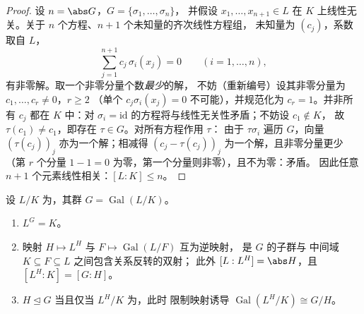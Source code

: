 \begin{proof}
设 $n = \abs G$，$G = \{\sigma_1, \dots, \sigma_n\}$，
并假设 $x_1, \dots, x_{n+1} \in L$ 在
$K$ 上线性无关。关于 $n$ 个方程、$n+1$ 个未知量的齐次线性方程组，
未知量为 $(c_j)$，系数取自 $L$，
\[
\sum_{j=1}^{n+1} c_j\,\sigma_i(x_j) = 0
\qquad (i = 1, \dots, n),
\]
有非零解。取一个非零分量个数\emph{最少}的解，
不妨（重新编号）设其非零分量为 $c_1, \dots, c_r \neq 0$，$r \geq 2$
（单个 $c_j\sigma_i(x_j) = 0$ 不可能），并规范化为
$c_r = 1$。并非所有 $c_j$ 都在 $K$ 中：对 $\sigma_i =
\mathrm{id}$ 的方程将与线性无关性矛盾；不妨设 $c_1 \notin K$，
故 $\tau(c_1) \ne c_1$，即存在 $\tau \in G$。对所有方程作用 $\tau$：
由于 $\tau\sigma_i$ 遍历 $G$，向量
$(\tau(c_j))_j$ 亦为一个解；相减得 $(c_j -
\tau(c_j))_j$ 为一个解，且非零分量更少
（第 $r$ 个分量 $1 - 1 = 0$ 为零，第一个分量则非零），且不为零：矛盾。
因此任意 $n+1$ 个元素线性相关：$[L:K]
\leq n$。
\end{proof}

\begin{theorem}[伽罗瓦理论基本定理]
\label{thm:b3:galois:fundamental}
设 $L/K$ 为，其群 $G =
\operatorname{Gal}(L/K)$。
\begin{enumerate}
  \item $L^G = K$。
  \item 映射 $H \mapsto L^H$ 与 $F \mapsto
        \operatorname{Gal}(L/F)$ 互为逆映射，
        是 $G$ 的子群与
        中间域 $K \subseteq F \subseteq L$ 之间包含关系反转的双射；
        此外 $[L : L^H] = \abs H$，且 $[L^H : K] = [G : H]$。
  \item $H \trianglelefteq G$ 当且仅当 $L^H/K$ 为，此时
        限制映射诱导 $\operatorname{Gal}(L^H/K) \cong
        G/H$。
\end{enumerate}
\end{theorem}

